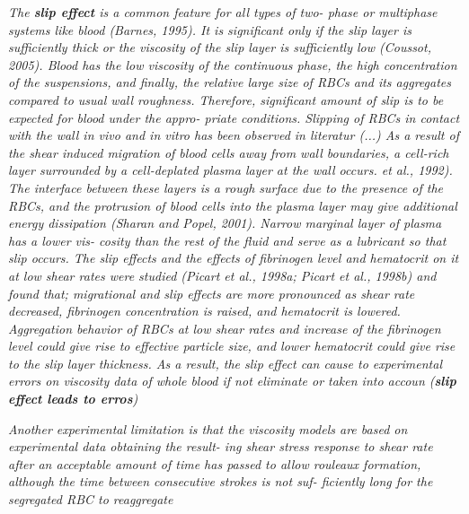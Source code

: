 \documentclass[11pt,letterpaper]{article}
\begin{document}
\textit{The \textbf{slip effect} is  a common  feature  for all types of two- phase or  multiphase systems like  blood (Barnes, 1995).  It is  significant only if  the slip layer is sufficiently thick  or the viscosity of the slip  layer  is sufficiently low  (Coussot, 2005). Blood has the low viscosity of the continuous phase, the high concentration of the  suspensions,  and finally,  the relative large size of RBCs and its aggregates compared to usual wall roughness. Therefore, significant amount of slip is to be expected for blood under the appro- priate  conditions. Slipping of RBCs in  contact with the wall in  vivo and  in vitro  has been  observed in literatur (...) As a  result of  the shear induced migration of blood cells  away from wall boundaries, a cell-rich layer surrounded by a  cell-deplated plasma  layer  at the wall occurs. et al., 1992). The interface between these layers is a  rough surface  due  to the  presence of the  RBCs, and the protrusion of blood cells into the plasma layer  may give additional energy  dissipation (Sharan and Popel, 2001). Narrow marginal layer of plasma has a  lower vis- cosity than the rest  of the fluid and  serve as a  lubricant so that slip occurs. The slip effects and the effects of fibrinogen level and hematocrit  on it  at low shear  rates were studied (Picart  et al., 1998a; Picart  et al., 1998b)  and found that; migrational and  slip effects are more pronounced as shear rate decreased, fibrinogen concentration is raised, and hematocrit is lowered. Aggregation behavior of RBCs at low shear rates and increase  of the fibrinogen level could give rise to effective particle size, and lower hematocrit could give rise to the slip layer thickness. As a result, the slip  effect can  cause to experimental errors on viscosity data of  whole blood if not eliminate or taken into accoun (\textbf{slip effect leads to erros})}

\textit{Another  experimental limitation is  that the viscosity
models are based  on  experimental data obtaining the result- ing  shear stress  response to  shear  rate after an acceptable amount of time has passed to allow rouleaux formation, although  the time between  consecutive strokes  is not suf- ficiently long  for the segregated RBC  to reaggregate}
\end{document}
